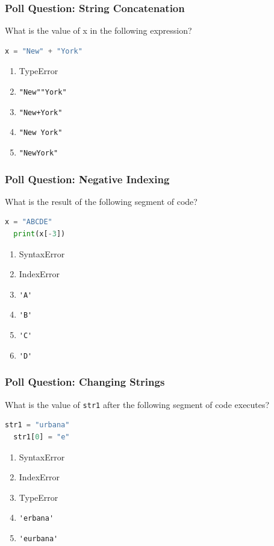 \documentclass{beamer}
\begin{document}
%
%
\begin{frame}[fragile]
  \frametitle{Poll Question: String Concatenation}
  What is the value of x in the following expression?
  \begin{lstlisting}[language=Python, autogobble] 
  x = "New" + "York"
  \end{lstlisting}
  \vfill
  \begin{enumerate}[A] 
    \item TypeError
    \item \lstinline{"New""York"} 
    \item \lstinline{"New+York"} 
    \item \lstinline{"New York"} %
    \item \lstinline{"NewYork"} 
  \end{enumerate}
\end{frame}

%
%
\begin{frame}[fragile]
  \frametitle{Poll Question: Negative Indexing}
  What is the result of the following segment of code?
  \begin{lstlisting}[language=Python, autogobble] 
  x = "ABCDE"
  print(x[-3])
  \end{lstlisting}
  \vfill
  \begin{enumerate}[A] 
    \item SyntaxError
    \item IndexError
    \item \lstinline{'A'}
    \item \lstinline{'B'}
    \item \lstinline{'C'} %
    \item \lstinline{'D'}
  \end{enumerate}
\end{frame}

%
%
\begin{frame}[fragile]
  \frametitle{Poll Question: Changing Strings}
  What is the value of \lstinline|str1| after the following segment of code executes?
  \begin{lstlisting}[language=Python, autogobble] 
  str1 = "urbana"
  str1[0] = "e"
  \end{lstlisting}
  \vfill
  \begin{enumerate}[A] 
    \item SyntaxError
    \item IndexError
    \item TypeError %
    \item \lstinline{'erbana'}
    \item \lstinline{'eurbana'}
  \end{enumerate}
\end{frame}
\end{document}
